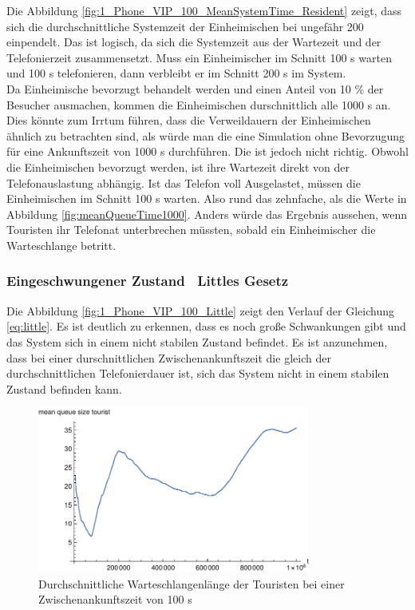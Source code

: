 Die Abbildung \ref{fig:1_Phone_VIP_100_MeanSystemTime_Resident} zeigt, dass sich die durchschnittliche Systemzeit der Einheimischen bei ungefähr 200 einpendelt. Das ist logisch, da sich die Systemzeit aus der Wartezeit und der Telefonierzeit zusammensetzt. Muss ein Einheimischer im Schnitt 100 s warten und 100 s telefonieren, dann verbleibt er im Schnitt 200 s im System.\\
Da Einheimische bevorzugt behandelt werden und einen Anteil von 10 \% der Besucher ausmachen, kommen die Einheimischen durschnittlich alle 1000 s an. Dies könnte zum Irrtum führen, dass die Verweildauern der Einheimischen ähnlich zu betrachten sind, als würde man die eine Simulation ohne Bevorzugung für eine Ankunftszeit von 1000 s durchführen. Die ist jedoch nicht richtig. Obwohl die Einheimischen bevorzugt werden, ist ihre Wartezeit direkt von der Telefonauslastung abhängig. Ist das Telefon voll Ausgelastet, müssen die Einheimischen im Schnitt 100 s warten. Also rund das zehnfache, als die Werte in Abbildung \ref{fig:meanQueueTime1000}. Anders würde das Ergebnis aussehen, wenn Touristen ihr Telefonat unterbrechen müssten, sobald ein Einheimischer die Warteschlange betritt.
\subsubsection{Eingeschwungener Zustand \ Littles Gesetz}
Die Abbildung \ref{fig:1_Phone_VIP_100_Little} zeigt den Verlauf der Gleichung \ref{eq:little}. Es ist deutlich zu erkennen, dass es noch große Schwankungen gibt und das System sich in einem nicht stabilen Zustand befindet. Es ist anzunehmen, dass bei einer durschnittlichen Zwischenankunftszeit die gleich der durchschnittlichen Telefonierdauer ist, sich das System nicht in einem stabilen Zustand befinden kann.

\begin{figure}[htpb]
	\centering
	\includegraphics[width=0.8\textwidth]{abbildungen/1_Phone_VIP/Arrival_100_Serve_100_dur_1000000_Skip_0/MeanQueueSizeTourist.pdf}
	\caption{Durchschnittliche Warteschlangenlänge der Touristen bei einer Zwischenankunftszeit von 100 s}
	\label{fig:1_Phone_VIP_100_MeanQueueSize_Tourist}
\end{figure}


